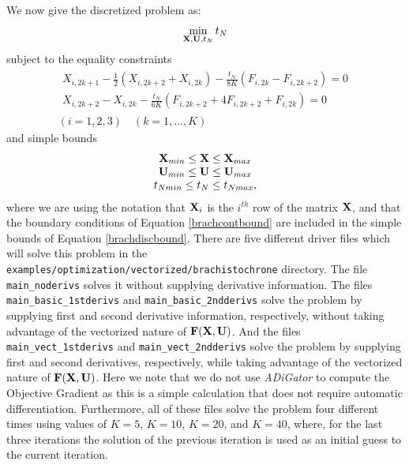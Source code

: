 \documentclass[10pt,pdftex]{article}
\begin{document}
We now give the discretized problem  as:
\begin{equation}
\min\limits_{\mathbf{X}, \mathbf{U}, t_N} t_N 
\end{equation}
subject to the equality constraints
\begin{equation}\label{bracheqcons}
\begin{array}{c}
\begin{array}{r}
X_{i,2k+1} - \frac{1}{2}(X_{i,2k+2} + X_{i,2k}) - \frac{t_N}{8K}(F_{i,2k} - F_{i,2k+2}) = 0 \\
X_{i,2k+2} - X_{i,2k} - \frac{t_N}{6K}(F_{i,2k+2} + 4F_{i,2k+2}  + F_{i,2k} ) = 0
\end{array}\\
(i = 1,2,3) \quad (k = 1,\dots,K)
\end{array}
\end{equation}
and simple bounds
\begin{equation}\label{brachdiscbound}
\begin{array}{c}
\mathbf{X}_{min} \leq \mathbf{X} \leq \mathbf{X}_{max} \\
\mathbf{U}_{min} \leq \mathbf{U} \leq \mathbf{U}_{max} \\
t_{Nmin} \leq t_N \leq t_{Nmax},
\end{array}
\end{equation}
where we are using the notation that $\mathbf{X}_i$ is the $i^{th}$ row of the matrix $\mathbf{X}$, and that the boundary conditions of Equation \ref{brachcontbound} are included in the simple bounds of Equation \ref{brachdiscbound}. There are five different driver files which will solve this problem in the \texttt{examples/optimization/vectorized/brachistochrone} directory. The file \texttt{main\_noderivs} solves it without supplying derivative information. The files \texttt{main\_basic\_1stderivs} and \texttt{main\_basic\_2ndderivs} solve the problem by supplying first and second derivative information, respectively, without taking advantage of the vectorized nature of $\mathbf{F}(\mathbf{X},\mathbf{U})$. And the files \texttt{main\_vect\_1stderivs} and \texttt{main\_vect\_2ndderivs} solve the problem by supplying first and second derivatives, respectively, while taking advantage of the vectorized nature of $\mathbf{F}(\mathbf{X},\mathbf{U})$. Here we note that we do not use \emph{ADiGator} to compute the Objective Gradient as this is a simple calculation that does not require automatic differentiation. Furthermore, all of these files solve the problem four different times using values of $K = 5$, $K = 10$, $K = 20$, and $K = 40$, where, for the last three iterations the solution of the previous iteration is used as an initial guess to the current iteration.
\end{document}
